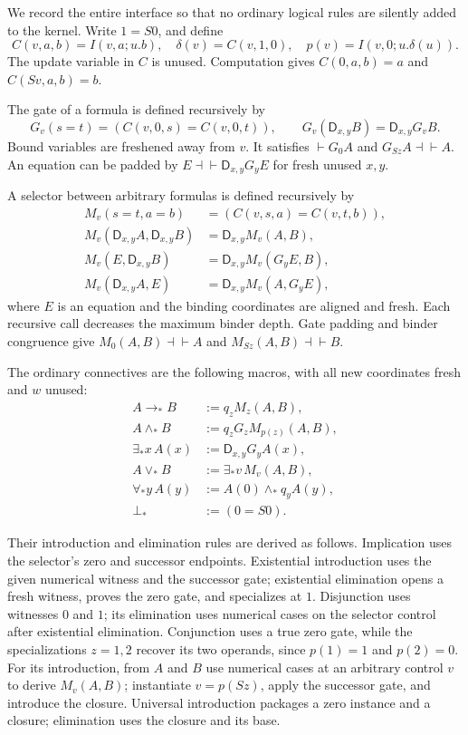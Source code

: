 \documentclass[11pt]{article}
\theoremstyle{definition}\newtheorem{definition}[theorem]{Definition}
\newcommand{\D}{\mathsf D}
\newcommand{\iffder}{\mathrel{\dashv\vdash}}
\begin{document}
We record the entire interface so that no ordinary logical rules are
silently added to the kernel. Write $1=S0$, and define
\[
 C(v,a,b)=I(v,a;u.b),\quad
 \delta(v)=C(v,1,0),\quad p(v)=I(v,0;u.\delta(u)).
\]
The update variable in $C$ is unused. Computation gives
$C(0,a,b)=a$ and $C(Sv,a,b)=b$.

The gate of a formula is defined recursively by
\[
 G_v(s=t)=(C(v,0,s)=C(v,0,t)),\qquad
 G_v(\D_{x,y}B)=\D_{x,y}G_vB.
\]
Bound variables are freshened away from $v$.
It satisfies $\vdash G_0A$ and $G_{Sz}A\iffder A$.
An equation can be padded by
$E\iffder\D_{x,y}G_yE$ for fresh unused $x,y$.

A selector between arbitrary formulas is defined recursively by
\begin{align*}
 M_v(s=t,a=b)&=(C(v,s,a)=C(v,t,b)),\\
 M_v(\D_{x,y}A,\D_{x,y}B)&=\D_{x,y}M_v(A,B),\\
 M_v(E,\D_{x,y}B)&=\D_{x,y}M_v(G_yE,B),\\
 M_v(\D_{x,y}A,E)&=\D_{x,y}M_v(A,G_yE),
\end{align*}
where $E$ is an equation and the binding coordinates are aligned
and fresh. Each recursive call decreases the maximum binder depth.
Gate padding and binder congruence give
$M_0(A,B)\iffder A$ and $M_{Sz}(A,B)\iffder B$.

The ordinary connectives are the following macros, with all new
coordinates fresh and $w$ unused:
\begin{align*}
 A\mathbin{\to_*}B&:=q_zM_z(A,B),\\
 A\mathbin{\wedge_*}B&:=q_zG_zM_{p(z)}(A,B),\\
 \exists_*x\,A(x)&:=\D_{x,y}G_yA(x),\\
 A\mathbin{\vee_*}B&:=\exists_*v\,M_v(A,B),\\
 \forall_*y\,A(y)&:=A(0)\mathbin{\wedge_*}q_yA(y),\\
 \bot_*&:=(0=S0).
\end{align*}

Their introduction and elimination rules are derived as follows.
Implication uses the selector's zero and successor endpoints.
Existential introduction uses the given numerical witness and the
successor gate; existential elimination opens a fresh witness,
proves the zero gate, and specializes at $1$. Disjunction uses
witnesses $0$ and $1$; its elimination uses numerical cases on the
selector control after existential elimination. Conjunction uses a
true zero gate, while the specializations $z=1,2$ recover its two
operands, since $p(1)=1$ and $p(2)=0$. For its introduction,
from $A$ and $B$ use numerical cases at an arbitrary control $v$
to derive $M_v(A,B)$; instantiate $v=p(Sz)$, apply the successor
gate, and introduce the closure. Universal introduction
packages a zero instance and a closure; elimination uses the closure
and its base.
\end{document}
